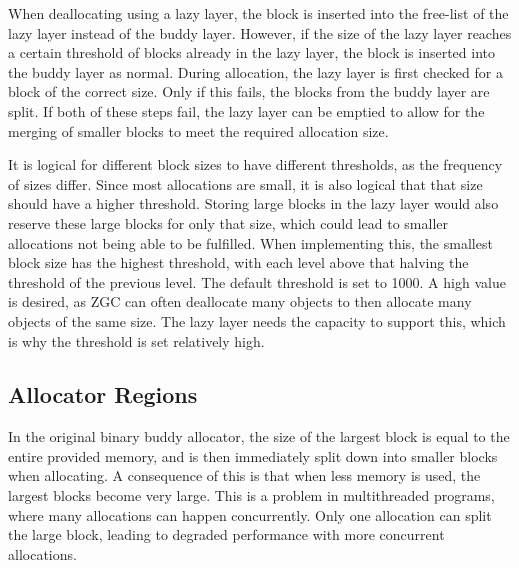 When deallocating using a lazy layer, the block is inserted into the free-list of the lazy layer instead of the buddy layer. However, if the size of the lazy layer reaches a certain threshold of blocks already in the lazy layer, the block is inserted into the buddy layer as normal. During allocation, the lazy layer is first checked for a block of the correct size. Only if this fails, the blocks from the buddy layer are split. If both of these steps fail, the lazy layer can be emptied to allow for the merging of smaller blocks to meet the required allocation size.

It is logical for different block sizes to have different thresholds, as the frequency of sizes differ. Since most allocations are small, it is also logical that that size should have a higher threshold. Storing large blocks in the lazy layer would also reserve these large blocks for only that size, which could lead to smaller allocations not being able to be fulfilled. When implementing this, the smallest block size has the highest threshold, with each level above that halving the threshold of the previous level. The default threshold is set to 1000. A high value is desired, as ZGC can often deallocate many objects to then allocate many objects of the same size. The lazy layer needs the capacity to support this, which is why the threshold is set relatively high.


\subsection{Allocator Regions} \label{sec:concurrencyexpl}

In the original binary buddy allocator, the size of the largest block is equal to the entire provided memory, and is then immediately split down into smaller blocks when allocating. A consequence of this is that when less memory is used, the largest blocks become very large. This is a problem in multithreaded programs, where many allocations can happen concurrently. Only one allocation can split the large block, leading to degraded performance with more concurrent allocations.

